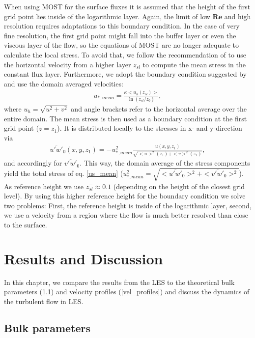 \documentclass[a4paper,11pt]{article}
\newcommand{\RE}{\mathbf{Re}}
\begin{document}
When using MOST for the surface fluxes it is assumed that the height of the first grid point lies inside of the logarithmic layer. Again, the limit of low $\RE$ and high resolution requires adaptations to this boundary condition. In the case of very fine resolution, the first grid point might fall into the buffer layer or even the viscous layer of the flow, so the equations of MOST are no longer adequate to calculate the local stress. To avoid that, we follow the recommendation of \cite{kawai2012wall} to use the horizontal velocity from a higher layer $z_{sl}$ to compute the mean stress in the constant flux layer. Furthermore, we adopt the boundary condition suggested by \cite{maronga2020improved} and use the domain averaged velocities:
\begin{align}\label{us_mean}
  u_{*,mean} = \frac{\kappa<u_h(z_{sl})>}{\ln(z_{sl}/z_0)},
\end{align}
where $u_h= \sqrt{u^2+v^2}$ and angle brackets refer to the horizontal average over the entire domain. The mean stress is then used as a boundary condition at the first grid point ($z=z_1$). It is distributed locally to the stresses in x- and y-direction via
\begin{align}
  \overline{u'w'}_0(x,y,z_1) = -u_{*,mean}^2 \frac{u(x,y,z_1)}{\sqrt{<u>^2(z_1)+<v>^2(z_1)}},
\end{align}
and accordingly for $\overline{v'w'}_0$. This way, the domain average of the stress components yield the total stress of eq. \ref{us_mean} ($u_{*,mean}^2 = \sqrt{<\overline{u'w'}_0>^2+<\overline{v'w'}_0>^2}$). As reference height we use $z_{sl}^- \approx 0.1$ (depending on the height of the closest grid level). By using this higher reference height for the boundary condition we solve two problems: First, the reference height is inside of the logarithmic layer, second, we use a velocity from a region where the flow is much better resolved than close to the surface.

\section{Results and Discussion}
\label{results}

In this chapter, we compare the results from the LES to the theoretical bulk parameters (\ref{bulk}) and velocity profiles (\ref{vel_profiles}) and discuss the dynamics of the turbulent flow in LES.

\subsection{Bulk parameters}
\label{bulk}
\end{document}
